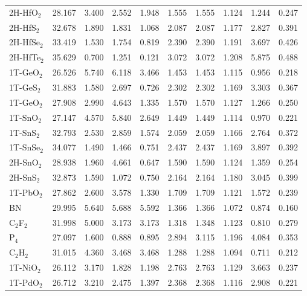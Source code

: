 \begin{center}
\begin{tabularx}{\linewidth}{lXXXXXXXXX}
    2H-HfO$_{2}$ & 28.167  & 3.400  & 2.552  & 1.948  & 1.555  & 1.555  & 1.124  & 1.244  & 0.247 \\
    2H-HfS$_{2}$ & 32.678  & 1.890  & 1.831  & 1.068  & 2.087  & 2.087  & 1.177  & 2.827  & 0.391 \\
    2H-HfSe$_{2}$ & 33.419  & 1.530  & 1.754  & 0.819  & 2.390  & 2.390  & 1.191  & 3.697  & 0.426 \\
    2H-HfTe$_{2}$ & 35.629  & 0.700  & 1.251  & 0.121  & 3.072  & 3.072  & 1.208  & 5.875  & 0.488 \\
    1T-GeO$_{2}$ & 26.526  & 5.740  & 6.118  & 3.466  & 1.453  & 1.453  & 1.115  & 0.956  & 0.218 \\
    1T-GeS$_{2}$ & 31.883  & 1.580  & 2.697  & 0.726  & 2.302  & 2.302  & 1.169  & 3.303  & 0.367 \\
    1T-GeO$_{2}$ & 27.908  & 2.990  & 4.643  & 1.335  & 1.570  & 1.570  & 1.127  & 1.266  & 0.250 \\
    1T-SnO$_{2}$ & 27.147  & 4.570  & 5.840  & 2.649  & 1.449  & 1.449  & 1.114  & 0.970  & 0.221 \\
    1T-SnS$_{2}$ & 32.793  & 2.530  & 2.859  & 1.574  & 2.059  & 2.059  & 1.166  & 2.764  & 0.372 \\
    1T-SnSe$_{2}$ & 34.077  & 1.490  & 1.466  & 0.751  & 2.437  & 2.437  & 1.169  & 3.897  & 0.392 \\
    2H-SnO$_{2}$ & 28.938  & 1.960  & 4.661  & 0.647  & 1.590  & 1.590  & 1.124  & 1.359  & 0.254 \\
    2H-SnS$_{2}$ & 32.873  & 1.590  & 1.072  & 0.750  & 2.164  & 2.164  & 1.180  & 3.045  & 0.399 \\
    1T-PbO$_{2}$ & 27.862  & 2.600  & 3.578  & 1.330  & 1.709  & 1.709  & 1.121  & 1.572  & 0.239 \\
    BN & 29.995  & 5.640  & 5.688  & 5.592  & 1.366  & 1.366  & 1.072  & 0.874  & 0.160 \\
    C$_{2}$F$_{2}$ & 31.998  & 5.000  & 3.173  & 3.173  & 1.318  & 1.348  & 1.123  & 0.810  & 0.279 \\
    P$_{4}$ & 27.097  & 1.600  & 0.888  & 0.895  & 2.894  & 3.115  & 1.196  & 4.084  & 0.353 \\
    C$_{2}$H$_{2}$ & 31.015  & 4.360  & 3.468  & 3.468  & 1.288  & 1.288  & 1.094  & 0.711  & 0.212\\ 
    1T-NiO$_{2}$ & 26.112  & 3.170  & 1.828  & 1.198  & 2.763  & 2.763  & 1.129  & 3.663  & 0.237\\ 
    1T-PdO$_{2}$ & 26.712  & 3.210  & 2.475  & 1.397  & 2.368  & 2.368  & 1.116  & 2.908  & 0.221 \\

\end{tabularx}
\end{center}
